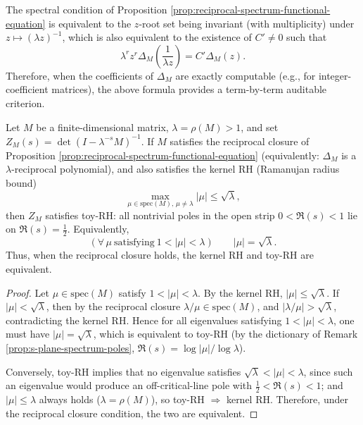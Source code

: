 \begin{remark}\label{rem:delta-reciprocal-polynomial}
The spectral condition of Proposition \ref{prop:reciprocal-spectrum-functional-equation} is equivalent to the $z$-root set being invariant (with multiplicity) under
\(
z\mapsto (\lambda z)^{-1}
\),
which is also equivalent to the existence of $C'\neq 0$ such that
\[
\lambda^{r}z^{r}\Delta_M\!\left(\frac{1}{\lambda z}\right)=C'\Delta_M(z).
\]
Therefore, when the coefficients of $\Delta_M$ are exactly computable (e.g., for integer-coefficient matrices), the above formula provides a term-by-term auditable criterion.
\end{remark}

\begin{proposition}[Reciprocal closure \texorpdfstring{$+$}{+} kernel RH \texorpdfstring{$\Rightarrow$}{=>} toy-RH]\label{prop:reciprocal-plus-kernel-rh-implies-toy-rh}
Let \(M\) be a finite-dimensional matrix, \(\lambda=\rho(M)>1\), and set
\(
Z_M(s)=\det(I-\lambda^{-s}M)^{-1}
\).
If \(M\) satisfies the reciprocal closure of Proposition \ref{prop:reciprocal-spectrum-functional-equation} (equivalently: \(\Delta_M\) is a \(\lambda\)-reciprocal polynomial), and also satisfies the kernel RH (Ramanujan radius bound)
\[
\max_{\mu\in\mathrm{spec}(M),\,\mu\neq \lambda}|\mu|\le \sqrt{\lambda},
\]
then \(Z_M\) satisfies toy-RH: all nontrivial poles in the open strip \(0<\Re(s)<1\) lie on \(\Re(s)=\tfrac12\).
Equivalently,
\[
(\forall\,\mu\ \text{satisfying}\ 1<|\mu|<\lambda)\qquad |\mu|=\sqrt{\lambda}.
\]
Thus, when the reciprocal closure holds, the kernel RH and toy-RH are equivalent.
\end{proposition}
\begin{proof}
Let \(\mu\in\mathrm{spec}(M)\) satisfy \(1<|\mu|<\lambda\). By the kernel RH, \(|\mu|\le \sqrt{\lambda}\).
If \(|\mu|<\sqrt{\lambda}\), then by the reciprocal closure \(\lambda/\mu\in\mathrm{spec}(M)\), and
\(
|\lambda/\mu|>\sqrt{\lambda}
\), contradicting the kernel RH.
Hence for all eigenvalues satisfying \(1<|\mu|<\lambda\), one must have \(|\mu|=\sqrt{\lambda}\), which is equivalent to toy-RH (by the dictionary of Remark \ref{prop:s-plane-spectrum-poles}, \(\Re(s)=\log|\mu|/\log\lambda\)).
\par
Conversely, toy-RH implies that no eigenvalue satisfies \(\sqrt{\lambda}<|\mu|<\lambda\), since such an eigenvalue would produce an off-critical-line pole with \(\tfrac12<\Re(s)<1\); and \(|\mu|\le \lambda\) always holds (\(\lambda=\rho(M)\)), so toy-RH \(\Rightarrow\) kernel RH.
Therefore, under the reciprocal closure condition, the two are equivalent.
\end{proof}


